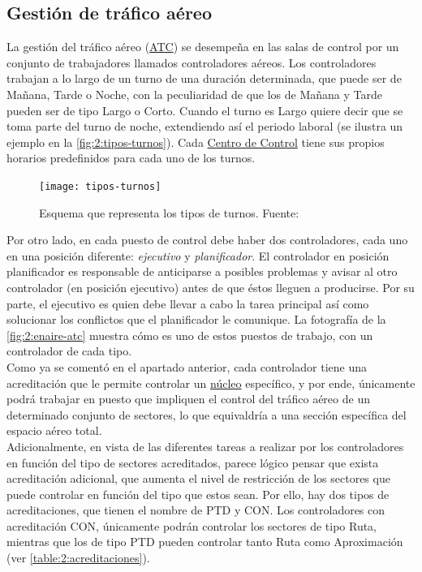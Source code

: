 \subsection{Gestión de tráfico aéreo}
La gestión del tráfico aéreo (\hyperref[ATC]{ATC}) se desempeña en las salas de control por un conjunto de trabajadores 
llamados controladores aéreos. Los controladores trabajan a lo largo de un turno de una duración determinada, que puede 
ser de Mañana, Tarde o Noche, con la peculiaridad de que los de Mañana y Tarde pueden ser de tipo Largo o Corto. Cuando 
el turno es Largo quiere decir que se toma parte del turno de noche, extendiendo así el periodo laboral (se ilustra un 
ejemplo en la \autoref{fig:2:tipos-turnos}). Cada \hyperref[ACC]{Centro de Control} tiene sus propios horarios 
predefinidos para cada uno de los turnos.
\\

\begin{figure}
    \centering
    \texttt{[image: tipos-turnos]}
    \caption{Esquema que representa los tipos de turnos. Fuente:~\cite{articulo1}}
    \label{fig:2:tipos-turnos}
\end{figure}

Por otro lado, en cada puesto de control debe haber dos controladores, cada uno en una posición diferente: 
\textit{ejecutivo} y \textit{planificador}. El controlador en posición planificador es responsable de anticiparse a 
posibles problemas y avisar al otro controlador (en posición ejecutivo) antes de que éstos lleguen a producirse. Por su 
parte, el ejecutivo es quien debe llevar a cabo la tarea principal así como solucionar los conflictos que el 
planificador le comunique. La fotografía de la \autoref{fig:2:enaire-atc} muestra cómo es uno de estos puestos de 
trabajo, con un controlador de cada tipo.
\\

Como ya se comentó en el apartado anterior, cada controlador tiene una acreditación que le permite controlar un 
\hyperref[Nucleo]{núcleo} específico, y por ende, únicamente podrá trabajar en puesto que impliquen el control del 
tráfico aéreo de un determinado conjunto de sectores, lo que equivaldría a una sección específica del espacio aéreo 
total.
\\

Adicionalmente, en vista de las diferentes tareas a realizar por los controladores en función del tipo de sectores 
acreditados, parece lógico pensar que exista acreditación adicional, que aumenta el nivel de restricción de los 
sectores que puede controlar en función del tipo que estos sean. Por ello, hay dos tipos de acreditaciones, que tienen 
el nombre de PTD y CON. Los controladores con acreditación CON, únicamente podrán controlar los sectores de tipo Ruta, 
mientras que los de tipo PTD pueden controlar tanto Ruta como Aproximación (ver 
\autoref{table:2:acreditaciones}).

